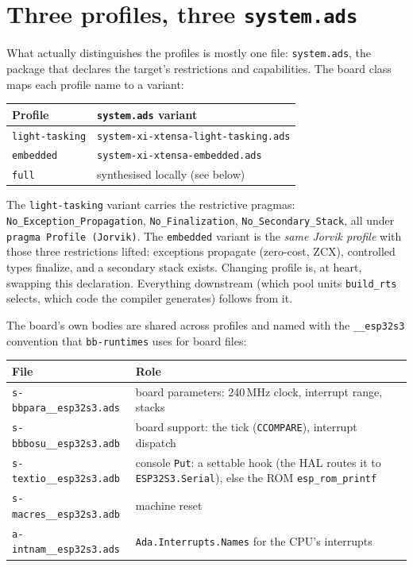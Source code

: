 \section{Three profiles, three \texttt{system.ads}}

What actually distinguishes the profiles is mostly one file: \texttt{system.ads},
the package that declares the target's restrictions and capabilities. The board
class maps each profile name to a variant:

\begin{center}
\begin{tabular}{l l}
\toprule
\textbf{Profile} & \textbf{\texttt{system.ads} variant} \\ \midrule
\texttt{light-tasking} & \texttt{system-xi-xtensa-light-tasking.ads} \\
\texttt{embedded}      & \texttt{system-xi-xtensa-embedded.ads} \\
\texttt{full}          & synthesised locally (see below) \\
\bottomrule
\end{tabular}
\end{center}

The \texttt{light-tasking} variant carries the restrictive pragmas:
\texttt{No\_Exception\_Propagation}, \texttt{No\_Finalization},
\texttt{No\_Secondary\_Stack}, all under \texttt{pragma Profile (Jorvik)}. The
\texttt{embedded} variant is the \emph{same Jorvik profile} with those three
restrictions lifted: exceptions propagate (zero-cost, ZCX), controlled types
finalize, and a secondary stack exists. Changing profile is, at heart, swapping
this declaration. Everything downstream (which pool units \texttt{build\_rts}
selects, which code the compiler generates) follows from it.

The board's own bodies are shared across profiles and named with the
\texttt{\_\_esp32s3} convention that \texttt{bb-runtimes} uses for board files:

\begin{center}
\begin{tabular}{l l}
\toprule
\textbf{File} & \textbf{Role} \\ \midrule
\texttt{s-bbpara\_\_esp32s3.ads} & board parameters: 240\,MHz clock, interrupt range, stacks \\
\texttt{s-bbbosu\_\_esp32s3.adb} & board support: the tick (\texttt{CCOMPARE}), interrupt dispatch \\
\texttt{s-textio\_\_esp32s3.adb} & console \texttt{Put}: a settable hook (the HAL routes it to \texttt{ESP32S3.Serial}), else the ROM \texttt{esp\_rom\_printf} \\
\texttt{s-macres\_\_esp32s3.adb} & machine reset \\
\texttt{a-intnam\_\_esp32s3.ads}  & \texttt{Ada.Interrupts.Names} for the CPU's interrupts \\
\bottomrule
\end{tabular}
\end{center}

